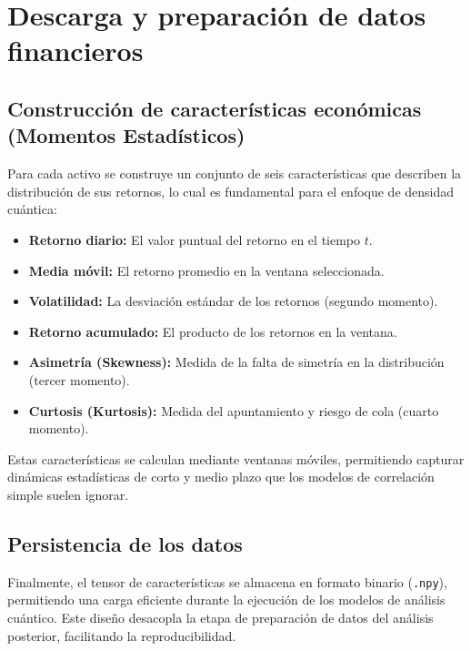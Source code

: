 \section{Descarga y preparación de datos financieros}
\label{sec:descarga_preparacion_datos}

\subsection{Construcción de características económicas (Momentos Estadísticos)}
\label{sec:construccion_caracteristicas_economicas}

Para cada activo se construye un conjunto de seis características que describen la distribución de sus retornos, lo cual es fundamental para el enfoque de densidad cuántica:

\begin{itemize}
\item \textbf{Retorno diario:} El valor puntual del retorno en el tiempo $t$.
\item \textbf{Media móvil:} El retorno promedio en la ventana seleccionada.
\item \textbf{Volatilidad:} La desviación estándar de los retornos (segundo momento).
\item \textbf{Retorno acumulado:} El producto de los retornos en la ventana.
\item \textbf{Asimetría (Skewness):} Medida de la falta de simetría en la distribución (tercer momento).
\item \textbf{Curtosis (Kurtosis):} Medida del apuntamiento y riesgo de cola (cuarto momento).
\end{itemize}

Estas características se calculan mediante ventanas móviles, permitiendo capturar dinámicas estadísticas de corto y medio plazo que los modelos de correlación simple suelen ignorar.

\subsection{Persistencia de los datos}
\label{sec:persistencia_datos}

Finalmente, el tensor de características se almacena en formato binario (\texttt{.npy}), permitiendo una carga eficiente durante la ejecución de los modelos de análisis cuántico. Este diseño desacopla la etapa de preparación de datos del análisis posterior, facilitando la reproducibilidad.